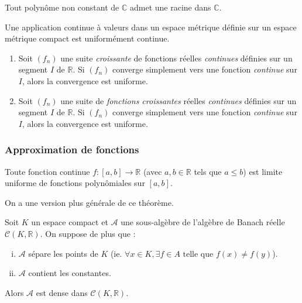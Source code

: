 
	\begin{application}
		Tout polynôme non constant de $\mathbb{C}$ admet une racine dans $\mathbb{C}$.
	\end{application}

	\begin{theorem}[Heine]
		Une application continue à valeurs dans un espace métrique définie sur un espace métrique compact est uniformément continue.
	\end{theorem}


	\begin{theorem}
		\begin{enumerate}
			\item Soit $(f_n)$ une suite \textit{croissante} de fonctions réelles \textit{continues} définies sur un segment $I$ de $\mathbb{R}$. Si $(f_n)$ converge simplement vers une fonction \textit{continue} sur $I$, alors la convergence est uniforme.
			\item Soit $(f_n)$ une suite de \textit{fonctions croissantes} réelles \textit{continues} définies sur un segment $I$ de $\mathbb{R}$. Si $(f_n)$ converge simplement vers une fonction \textit{continue} sur $I$, alors la convergence est uniforme.
		\end{enumerate}
	\end{theorem}

	\subsubsection{Approximation de fonctions}


	\begin{theorem}[Weierstrass]
		Toute fonction continue $f : [a,b] \rightarrow \mathbb{R}$ (avec $a, b \in \mathbb{R}$ tels que $a \leq b$) est limite uniforme de fonctions polynômiales sur $[a, b]$.
	\end{theorem}

	On a une version plus générale de ce théorème.


	\begin{theorem}
		Soit $K$ un espace compact et $\mathcal{A}$ une sous-algèbre de l'algèbre de Banach réelle $\mathcal{C}(K, \mathbb{R})$. On suppose de plus que :
		\begin{enumerate}[(i)]
			\item $\mathcal{A}$ sépare les points de $K$ (ie. $\forall x \in K, \exists f \in A \text{ telle que } f(x) \neq f(y)$).
			\item $\mathcal{A}$ contient les constantes.
		\end{enumerate}
		Alors $\mathcal{A}$ est dense dans $\mathcal{C}(K, \mathbb{R})$.
	\end{theorem}

